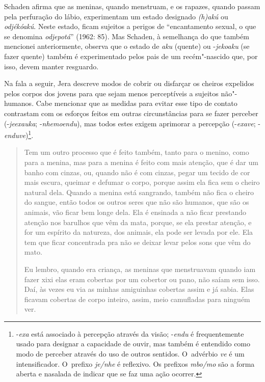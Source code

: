 Schaden afirma que as meninas, quando menstruam, e os rapazes, quando
passam pela perfuração do lábio, experimentam um estado designado
\emph{(h)akú} ou \emph{odjékóakú}. Neste estado, ficam sujeitos a perigos de
``encantamento sexual, o que se denomina \emph{odjepotá}'' (1962: 85). Mas
Schaden, à semelhança do que também mencionei anteriormente, observa
que o estado de \emph{aku} (quente) ou -\emph{jekoaku} (se fazer quente) também é
experimentado pelos pais de um recém"-nascido que, por isso, devem
manter resguardo. 

Na fala a seguir, Jera descreve modos de cobrir ou disfarçar os cheiros
expelidos pelos corpos dos jovens para que sejam menos perceptíveis a
sujeitos não"-humanos. Cabe mencionar que as medidas para evitar esse
tipo de contato contrastam com os esforços feitos em outras
circunstâncias para se fazer perceber (-\emph{jeexauka}; -\emph{nhemoendu}), mas
todos estes exigem aprimorar a percepção (-\emph{exave};
-\emph{enduve})\footnote{-\emph{exa} está associado à percepção através da visão;
-\emph{endu} é frequentemente usado para designar a capacidade de ouvir, mas
também é entendido como modo de perceber através do uso de outros
sentidos. O~advérbio \emph{ve} é um intensificador. O~prefixo \emph{je/nhe} é
reflexivo. Os prefixos \emph{mbo/mo} são a forma aberta e nasalada de indicar
que se faz uma ação ocorrer. }. 

\begin{quote}
\noindent
Tem um outro processo que é feito também, tanto para o menino, como para
a menina, mas para a menina é feito com mais atenção, que é dar um
banho com cinzas, ou, quando não é com cinzas, pegar um tecido de cor
mais escura, queimar e defumar o corpo, porque assim ela fica sem o
cheiro natural dela. Quando a menina está sangrando, também não fica o
cheiro do sangue, então todos os outros seres que não são humanos, que
são os animais, vão ficar bem longe dela. Ela é ensinada a não ficar
prestando atenção nos barulhos que vêm da mata, porque, se ela prestar
atenção, e for um espírito da natureza, dos animais, ela pode ser
levada por ele. Ela tem que ficar concentrada pra não se deixar levar
pelos sons que vêm do mato.

\noindent
Eu lembro, quando era criança, as meninas que menstruavam quando iam
fazer xixi elas eram cobertas por um cobertor ou pano, não saíam sem
isso. Daí, às vezes eu via as minhas amiguinhas cobertas assim e já
sabia. Elas ficavam cobertas de corpo inteiro, assim, meio camufladas
para ninguém ver.
\end{quote}

